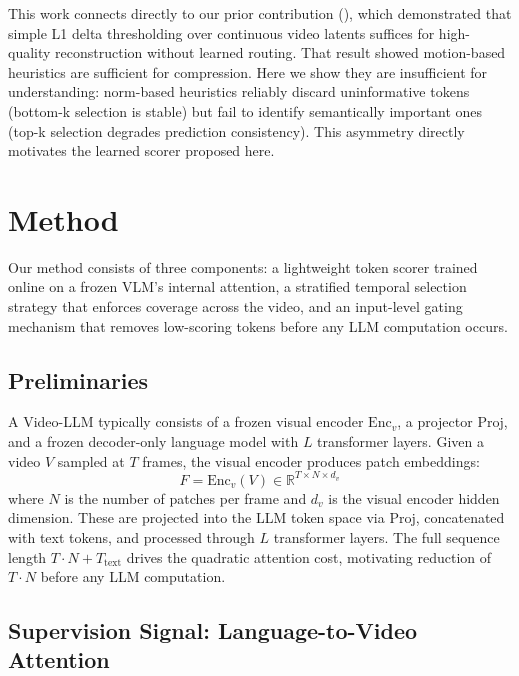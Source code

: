 \documentclass[12pt]{article}
\begin{document}
This work connects directly to our prior contribution (\cite{dave2026adaptivetokenisationtemporalredundancy}), which demonstrated that simple L1 delta thresholding over continuous video latents suffices for high-quality reconstruction without learned routing. That result showed motion-based heuristics are sufficient for compression. Here we show they are insufficient for understanding: norm-based heuristics reliably discard uninformative tokens (bottom-k selection is stable) but fail to identify semantically important ones (top-k selection degrades prediction consistency). This asymmetry directly motivates the learned scorer proposed here.

\section{Method}
 
Our method consists of three components: a lightweight token scorer
trained online on a frozen VLM's internal attention, a stratified
temporal selection strategy that enforces coverage across the video,
and an input-level gating mechanism that removes low-scoring tokens
before any LLM computation occurs.
 
\subsection{Preliminaries}
 
A Video-LLM typically consists of a frozen visual encoder
$\text{Enc}_v$, a projector $\text{Proj}$, and a frozen decoder-only
language model with $L$ transformer layers. Given a video $V$ sampled
at $T$ frames, the visual encoder produces patch embeddings:
%
\begin{equation}
    F = \text{Enc}_v(V) \in \mathbb{R}^{T \times N \times d_v}
\end{equation}
%
where $N$ is the number of patches per frame and $d_v$ is the visual
encoder hidden dimension. These are projected into the LLM token space
via $\text{Proj}$, concatenated with text tokens, and processed
through $L$ transformer layers. The full sequence length $T \cdot N +
T_{\text{text}}$ drives the quadratic attention cost, motivating
reduction of $T \cdot N$ before any LLM computation.
 
\subsection{Supervision Signal: Language-to-Video Attention}
 
\end{document}
